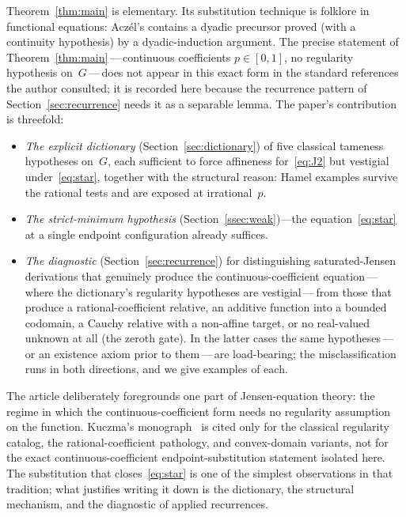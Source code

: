 \documentclass{article}
\theoremstyle{plain}
\theoremstyle{definition}
\begin{document}
Theorem~\ref{thm:main} is elementary. Its substitution
technique is folklore in functional equations: Acz\'el's
\cite[\S2.1.4]{Aczel1966} contains a dyadic precursor proved (with a
continuity hypothesis) by a dyadic-induction argument. The precise
statement of Theorem~\ref{thm:main}\,---\,continuous coefficients
$p\in[0,1]$, no regularity hypothesis on~$G$\,---\,does not appear in
this exact form in the standard references the author consulted; it is
recorded here because the recurrence pattern of
Section~\ref{sec:recurrence} needs it as a separable lemma. The paper's contribution is threefold:
\begin{itemize}
\item \emph{The explicit dictionary} (Section~\ref{sec:dictionary}) of
  five classical tameness hypotheses on~$G$, each sufficient to force
  affineness for~\eqref{eq:J2} but vestigial under~\eqref{eq:star},
  together with the structural reason: Hamel examples survive the
  rational tests and are exposed at irrational~$p$.

\item \emph{The strict-minimum hypothesis}
  (Section~\ref{ssec:weak})---the
  equation~\eqref{eq:star} at a single endpoint configuration already
  suffices.

\item \emph{The diagnostic} (Section~\ref{sec:recurrence}) for
  distinguishing saturated-Jensen derivations that genuinely produce
  the continuous-coefficient equation\,---\,where the dictionary's
  regularity hypotheses are vestigial\,---\,from those that produce a
  rational-coefficient relative, an additive function into a bounded
  codomain, a Cauchy relative with a non-affine target, or no
  real-valued unknown at all (the zeroth gate). In the
  latter cases the same hypotheses\,---\,or an existence axiom prior
  to them\,---\,are load-bearing; the
  misclassification runs in both directions, and we give examples of
  each.
\end{itemize}

The article deliberately foregrounds one part of Jensen-equation
theory: the regime in which the continuous-coefficient form needs no
regularity assumption on the function. Kuczma's monograph~\cite{Kuczma2009}
is cited only for the classical regularity catalog, the rational-coefficient
pathology, and convex-domain variants, not for the exact
continuous-coefficient endpoint-substitution statement isolated here.
The substitution that closes~\eqref{eq:star} is one of the simplest
observations in that tradition; what justifies writing it down is the
dictionary, the structural mechanism, and the diagnostic of applied
recurrences.
\end{document}

